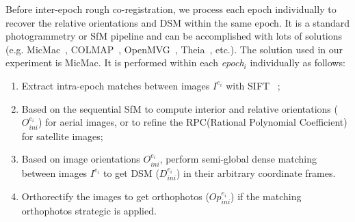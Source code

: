 Before inter-epoch rough co-registration, we process each epoch individually to recover the relative orientations and DSM within the same epoch. It is a standard photogrammetry or SfM pipeline and can be accomplished with lots of solutions (e.g. MicMac~\cite{deseilligny2011apero}, COLMAP~\cite{schonberger2016structure}, {OpenMVG~\cite{openMVG}, Theia~\cite{theia}, etc.}). The solution used in our experiment is MicMac. It is performed within each \textit{epoch$_i$} individually as follows:
\begin{enumerate}
\item Extract intra-epoch matches between images $I^{e_i}$ with SIFT ~\cite{lowe2004distinctive};
\item Based on the sequential SfM to compute interior and relative orientations ({$O_{ini}^{e_i}$}) for aerial images, or to refine the RPC(Rational Polynomial Coefficient) for satellite images;
\item Based on image orientations $O_{ini}^{e_i}$, perform semi-global dense matching~\cite{mpd:06:sgm} {between images $I^{e_i}$} to get {DSM ($D_{ini}^{e_i}$) in their arbitrary coordinate frames.}
\item Orthorectify the images to get orthophotos ($Op_{ini}^{e_i}$) if the matching orthophotos strategic is applied.
\end{enumerate}
